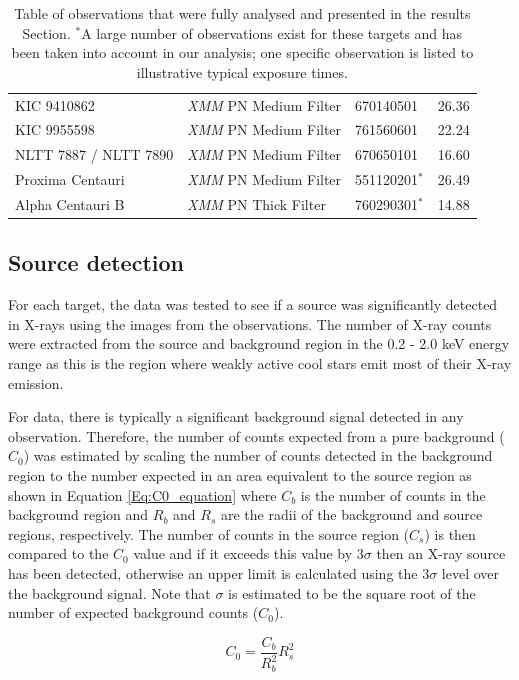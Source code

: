 \begin{table}[t]
{\begin{tabular}{lllc}
		KIC 9410862 & \textit{XMM} PN Medium Filter & 670140501 & 26.36\\
		KIC 9955598 & \textit{XMM} PN Medium Filter & 761560601 & 22.24 \\
		NLTT 7887 / NLTT 7890 & \textit{XMM} PN Medium Filter & 670650101 & 16.60  \\
		Proxima Centauri & \textit{XMM} PN Medium Filter & 551120201$^*$ & 26.49 \\
		Alpha Centauri B & \textit{XMM} PN Thick Filter & 760290301$^*$ & 14.88 \\     
		\hline
		\end{tabular}}
		\caption[List of X-ray observations used in study]{Table of observations that were fully analysed and presented in the results Section. $^*$A large number of observations exist for these targets and has been taken into account in our analysis; one specific observation is listed to illustrative typical exposure times.}
		\label{table:xray_obs_details}
\end{table}

\subsection{Source detection}
For each target, the data was tested to see if a source was significantly detected in X-rays using the images from the observations. The number of X-ray counts were extracted from the source and background region in the 0.2 - 2.0 keV energy range as this is the region where weakly active cool stars emit most of their X-ray emission.

For \XMM data, there is typically a significant background signal detected in any observation. Therefore, the number of counts expected from a pure background  ($C_{0}$) was estimated by scaling the number of counts detected in the background region to the number expected in an area equivalent to the source region as shown in Equation \ref{Eq:C0_equation} where $C_{b}$ is the number of counts in the background region and $R_{b}$ and $R_{s}$ are the radii of the background and source regions, respectively. The number of counts in the source region ($C_{s}$) is then compared to the $C_{0}$ value and if it exceeds this value by $3\sigma$ then an X-ray source has been detected, otherwise an upper limit is calculated using the $3\sigma$ level over the background signal. Note that $\sigma$ is estimated to be the square root of the number of expected background counts ($C_{0}$). 

\begin{equation}
    C_{0} = \frac{C_{b}}{R_{b}^{2}}R_{s}^{2}
    \label{Eq:C0_equation}
\end{equation}

